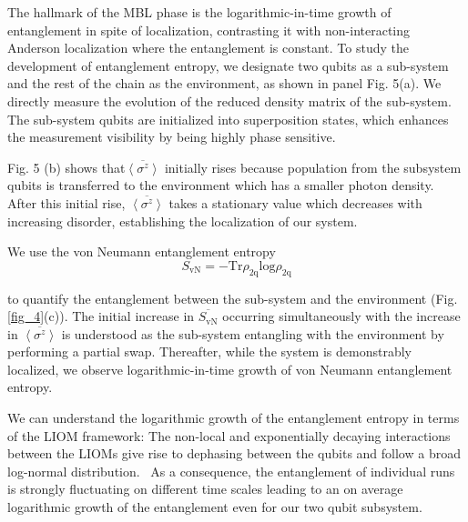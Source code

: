 The hallmark of the MBL phase is the logarithmic-in-time growth of entanglement in spite of localization, contrasting it with non-interacting Anderson localization where the entanglement is constant.
To study the development of entanglement entropy, we designate two qubits as a sub-system and the rest of the chain as the environment, as shown in panel Fig. 5(a).  %
We directly measure the evolution of the reduced density matrix of the sub-system.
The sub-system qubits are initialized into superposition states, which enhances the measurement visibility by being highly phase sensitive.


Fig. 5 (b) shows that$\overline{ \left< \sigma^z \right> }$ initially rises because population from the subsystem qubits is transferred to the environment which has a smaller photon density.
After this initial rise, $\overline{ \left< \sigma^z \right> }$ takes a stationary value which decreases with increasing disorder, establishing the localization of our system.

We use the von Neumann entanglement entropy
\begin{equation}
    S_{\text{vN}}=-\text{Tr} \rho_{\text{2q}} \text{log} \rho_{\text{2q}}
\end{equation}

\noindent to quantify the entanglement between the sub-system and the environment (Fig. \ref{fig_4}(c)).
The initial increase in $\overline{ S_{\text{vN}} }$ occurring simultaneously with the increase in $\overline{ \left< \sigma^z \right> }$ is understood as the sub-system entangling with the environment by performing a partial swap.
Thereafter, while the system is demonstrably localized, we observe logarithmic-in-time growth of von Neumann entanglement entropy.

We can understand the logarithmic growth of the entanglement entropy in terms of the LIOM framework: The non-local and exponentially decaying interactions between the LIOMs give rise to dephasing between the qubits and follow a broad log-normal distribution.~\autocite{Varma2019} As a consequence, the entanglement of individual runs is strongly fluctuating on different time scales leading to an on average logarithmic growth of the entanglement even for our two qubit subsystem.


